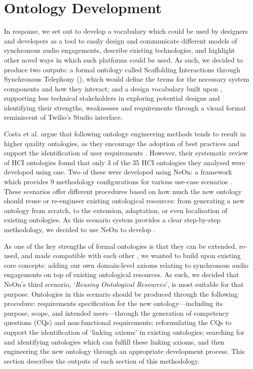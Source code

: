 \section{Ontology Development}

In response, we set out to develop a vocabulary which could be used by designers and developers as a tool to easily design and communicate different models of synchronous audio engagements, describe existing technologies, and highlight other novel ways in which such platforms could be used. As such, we decided to produce two outputs: a formal ontology called Scaffolding Interactions through Synchronous Telephony (\ONT{}), which would define the terms for the necessary system components and how they interact; and a design vocabulary built upon \ONT{}, supporting less technical stakeholders in exploring potential designs and identifying their strengths, weaknesses and requirements through a visual format reminiscent of Twilio's Studio interface.

Costa et al. argue that following ontology engineering methods tends to result in higher quality ontologies, as they encourage the adoption of best practices and support the identification of user requirements \cite{costa2021}. However, their systematic review of HCI ontologies found that only 3 of the 35 HCI ontologies they analysed were developed using one. Two of these were developed using NeOn: a framework which provides 9 methodology configurations for various use-case scenarios \cite{gomez2009, suarez2012}. These scenarios offer different procedures based on how much the new ontology should reuse or re-engineer existing ontological resources: from generating a new ontology from scratch, to the extension, adaptation, or even localisation of existing ontologies. As this scenario system provides a clear step-by-step methodology, we decided to use NeOn to develop \ONT{}.

As one of the key strengths of formal ontologies is that they can be extended, re-used, and made compatible with each other \cite{scherp2011}, we wanted to build upon existing core concepts: adding our own domain-level axioms relating to synchronous audio engagements on top of existing ontological resources. As such, we decided that NeOn's third scenario, `\textit{Reusing Ontological Resources}', is most suitable for that purpose. Ontologies in this scenario \cite{suarez2012_reuse} should be produced through the following procedure: requirements specification for the new ontology---including its purpose, scope, and intended users---through the generation of competency questions (CQs) and non-functional requirements; reformulating the CQs to support the identification of `linking axioms' in existing ontologies; searching for and identifying ontologies which can fulfill these linking axioms, and then engineering the new ontology through an appropriate development process. This section describes the outputs of each section of this methodology.

